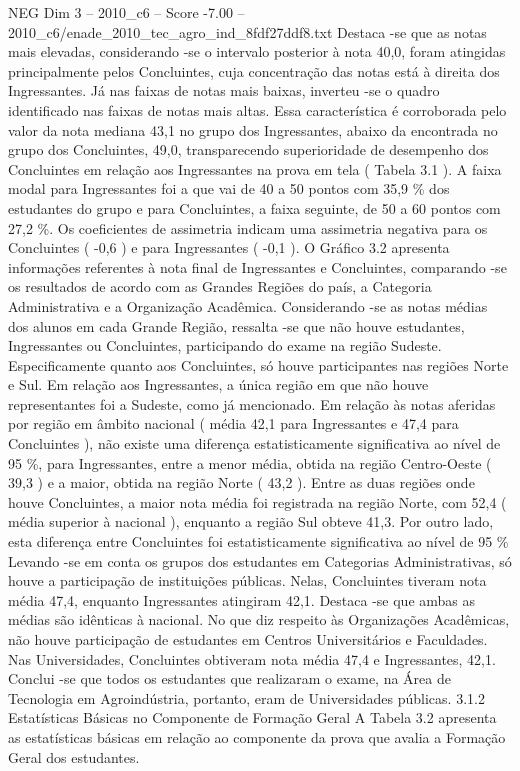 \begin{textsample}{NEG Dim 3 – 2010\_c6 – Score -7.00 – 2010\_c6/enade\_2010\_tec\_agro\_ind\_8fdf27ddf8.txt}
Destaca -se que as notas mais elevadas, considerando -se o intervalo posterior à nota 40,0, foram atingidas principalmente pelos Concluintes, cuja concentração das notas está à direita dos Ingressantes.
Já nas faixas de notas mais baixas, inverteu -se o quadro identificado nas faixas de notas mais altas.
Essa característica é corroborada pelo valor da nota mediana 43,1 no grupo dos Ingressantes, abaixo da encontrada no grupo dos Concluintes, 49,0, transparecendo superioridade de desempenho dos Concluintes em relação aos Ingressantes na prova em tela ( Tabela 3.1 ).
A faixa modal para Ingressantes foi a que vai de 40 a 50 pontos com 35,9 \% dos estudantes do grupo e para Concluintes, a faixa seguinte, de 50 a 60 pontos com 27,2 \%.
Os coeficientes de assimetria indicam uma assimetria negativa para os Concluintes ( -0,6 ) e para Ingressantes ( -0,1 ).
O Gráfico 3.2 apresenta informações referentes à nota final de Ingressantes e Concluintes, comparando -se os resultados de acordo com as Grandes Regiões do país, a Categoria Administrativa e a Organização Acadêmica.
Considerando -se as notas médias dos alunos em cada Grande Região, ressalta -se que não houve estudantes, Ingressantes ou Concluintes, participando do exame na região Sudeste.
Especificamente quanto aos Concluintes, só houve participantes nas regiões Norte e Sul.
Em relação aos Ingressantes, a única região em que não houve representantes foi a Sudeste, como já mencionado.
Em relação às notas aferidas por região em âmbito nacional ( média 42,1 para Ingressantes e 47,4 para Concluintes ), não existe uma diferença estatisticamente significativa ao nível de 95 \%, para Ingressantes, entre a menor média, obtida na região Centro-Oeste ( 39,3 ) e a maior, obtida na região Norte ( 43,2 ).
Entre as duas regiões onde houve Concluintes, a maior nota média foi registrada na região Norte, com 52,4 ( média superior à nacional ), enquanto a região Sul obteve 41,3.
Por outro lado, esta diferença entre Concluintes foi estatisticamente significativa ao nível de 95 \% Levando -se em conta os grupos dos estudantes em Categorias Administrativas, só houve a participação de instituições públicas.
Nelas, Concluintes tiveram nota média 47,4, enquanto Ingressantes atingiram 42,1.
Destaca -se que ambas as médias são idênticas à nacional.
No que diz respeito às Organizações Acadêmicas, não houve participação de estudantes em Centros Universitários e Faculdades.
Nas Universidades, Concluintes obtiveram nota média 47,4 e Ingressantes, 42,1.
Conclui -se que todos os estudantes que realizaram o exame, na Área de Tecnologia em Agroindústria, portanto, eram de Universidades públicas. 3.1.2 Estatísticas Básicas no Componente de Formação Geral A Tabela 3.2 apresenta as estatísticas básicas em relação ao componente da prova que avalia a Formação Geral dos estudantes.

\end{textsample}
